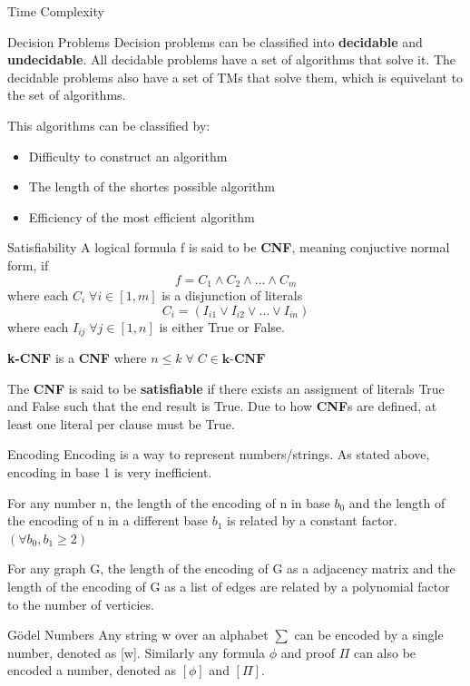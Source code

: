 \documentclass[12pt, letterpaper]{article}
\begin{document}
\begin{section}{Time Complexity}
\begin{subsection}{Decision Problems}
    Decision problems can be classified into \textbf{decidable} and \textbf{undecidable}.
    All decidable problems have a set of algorithms that solve it. The decidable
    problems also have a set of TMs that solve them, which is equivelant to
    the set of algorithms.

    This algorithms can be classified by:
    \begin{itemize}
      \item Difficulty to construct an algorithm
      \item The length of the shortes possible algorithm
      \item Efficiency of the most efficient algorithm
    \end{itemize}

    \begin{subsubsection}{Satisfiability}
      A logical formula f is said to be \textbf{CNF}, meaning conjuctive normal form, if
      \[f = C_{1} \land C_{2} \land \dots \land C_{m}\]
      where each \(C_{i} \; \forall i \in [1, m]\) is a disjunction of literals
      \[C_{i} = (I_{i1} \lor I_{i2} \lor \dots \lor I_{in})\]
      where each \(I_{ij} \; \forall j \in [1, n]\) is either True or False.

      \textbf{k-CNF} is a \textbf{CNF} where \(n \leq k \; \forall \; C \in \textbf{k-CNF}\)

      The \textbf{CNF} is said to be \textbf{satisfiable} if there exists an
      assigment of literals True and False such that the end result is True.
      Due to how \textbf{CNF}s are defined, at least one literal per clause must be True.
    \end{subsubsection}

  \end{subsection}

  \begin{subsection}{Encoding}
    Encoding is a way to represent numbers/strings. As stated above, encoding
    in base 1 is very inefficient.

    For any number n, the length of the encoding of n in base \(b_{0}\) and the
    length of the encoding of n in a different base \(b_{1}\) is related by
    a constant factor. \((\forall b_{0}, b_{1} \geq 2)\)

    For any graph G, the length of the encoding of G as a adjacency matrix and
    the length of the encoding of G as a list of edges are related by
    a polynomial factor to the number of verticies.

    \begin{subsubsection}{Gödel Numbers}
      Any string w over an alphabet \(\sum\) can be encoded by a single number,
      denoted as [w]. Similarly any formula \(\phi\) and proof \(\Pi\)
      can also be encoded a number, denoted as \([\phi]\) and \([\Pi]\).


\end{subsubsection}
\end{subsection}
\end{section}
\end{document}
